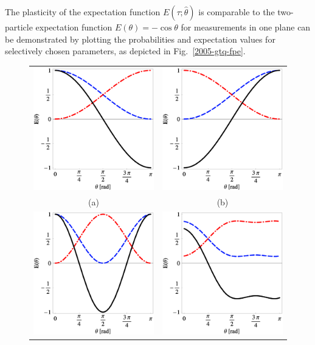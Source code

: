 \documentclass[rmp,amsfonts,showpacs,showkeys,preprint]{revtex4}
\begin{document}
The plasticity of the expectation function
$E(\tau  ;{\hat \theta} )$ is comparable to the two-particle
expectation function $E(\theta)=-\cos \theta$
for measurements in one plane can  be demonstrated by plotting
the probabilities and expectation values for selectively chosen parameters,
as depicted in Fig.~\ref{2005-gtq-fpe}.
%
%
%
%
%
\begin{figure}[htbp]
  \centering
\begin{tabular}{cc}
  \includegraphics[width=60mm]{2005-gtq-fr1-1}&
  \includegraphics[width=60mm]{2005-gtq-fr1-2}\\
\quad \qquad (a) &\quad  \quad (b)\\
  \includegraphics[width=60mm]{2005-gtq-fr1-3}&
  \includegraphics[width=60mm]{2005-gtq-fr1-4}\\

\end{tabular}
\end{figure}
\end{document}
